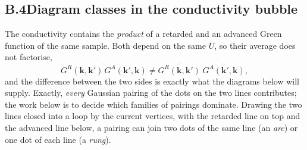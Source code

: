 \subsection*{B.4\quad Diagram classes in the conductivity bubble}

The conductivity contains the \emph{product} of a retarded and an
advanced Green function of the same sample. Both depend on the
same $U$, so their average does not factorise,
\[
\overline{G^R(\mathbf k,\mathbf k')\,
G^A(\mathbf k',\mathbf k)}
\neq
\overline{G^R(\mathbf k,\mathbf k')}\;
\overline{G^A(\mathbf k',\mathbf k)},
\]
and the difference between the two sides is exactly what the
diagrams below will supply. Exactly, \emph{every} Gaussian pairing
of the dots on the two lines contributes; the work below is to
decide which families of pairings dominate. Drawing the two lines
closed into a loop by the current vertices, with the retarded
line on top and the advanced line below, a pairing can join two
dots of the same line (an \emph{arc}) or one dot of each line
(a \emph{rung}).

